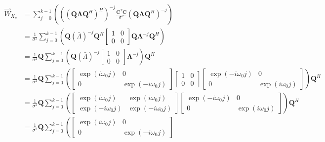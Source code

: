 \documentclass[11pt,a4paper,twoside]{report}
\newcommand{\messF}[3]{\overrightarrow{#1}_{{#2}_{k{#3}}}}
\newcommand{\mat}[1]{\mathbf{#1}}
\begin{document}
\begin{align}
	\nonumber
	\messF{W}{X}{} &= \sum_{j=0}^{k-1}\left(\left(\left(\mat{Q\Lambda}\mat{Q}^H\right)^H\right)^{-j}\frac{\mat{C}^T\mat{C}}{\sigma^2}\left(\mat{Q\Lambda}\mat{Q}^H\right)^{-j}\right) \\
	\label{eq: update rule, unitary Q}
	&= \frac{1}{\sigma^2}\sum_{j=0}^{k-1}\left(\mat{Q}\left(\bar{\Lambda}\right)^{-j}\mat{Q}^H
		\begin{bmatrix}
			1 & 0 \\
			0 & 0
		\end{bmatrix}
		\mat{Q}\mat{\Lambda}^{-j}\mat{Q}^H\right)
	\\
	\nonumber
	&= \frac{1}{\sigma^2}\mat{Q}\sum_{j=0}^{k-1}\left(\mat{Q}\left(\bar{\Lambda}\right)^{-j}
		\begin{bmatrix}
			1 & 0 \\
			0 & 0
		\end{bmatrix}
		\mat{\Lambda}^{-j}\right)\mat{Q}^H
	\\
	\nonumber
	&= \frac{1}{\sigma^2}\mat{Q}\sum_{j=0}^{k-1}\left(
		\begin{bmatrix}
			\exp{(i\omega_0j)} & 0 \\
			0 & \exp{(-i\omega_0j)}
		\end{bmatrix}
		\begin{bmatrix}
			1 & 0 \\
			0 & 0
		\end{bmatrix}
		\begin{bmatrix}
			\exp{(-i\omega_0j)} & 0 \\
			0 & \exp{(i\omega_0j)}
		\end{bmatrix}
		\right)\mat{Q}^H
	\\
	\nonumber
	&= \frac{1}{\sigma^2}\mat{Q}\sum_{j=0}^{k-1}\left(
		\begin{bmatrix}
			\exp{(i\omega_0j)} & \exp{(i\omega_0j)} \\
			\exp{(-i\omega_0j)} & \exp{(-i\omega_0j)}
		\end{bmatrix}
		\begin{bmatrix}
			\exp{(-i\omega_0j)} & 0 \\
			0 & \exp{(i\omega_0j)}
		\end{bmatrix}
		\right)\mat{Q}^H
	\\
	\nonumber
	&= \frac{1}{\sigma^2}\mat{Q}\sum_{j=0}^{k-1}\left(
		\begin{bmatrix}
			\exp{(i\omega_0j)} & 0 \\
			0 & \exp{(-i\omega_0j)}
		\end{bmatrix}

\end{align}
\end{document}
